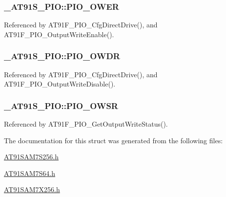 \hypertarget{struct__AT91S__PIO_c5ccf9a9b596512f34e6c324b406e071}{
\subsubsection{ {\bf \_\-AT91S\_\-PIO::PIO\_\-OWER}}}
\label{struct__AT91S__PIO_c5ccf9a9b596512f34e6c324b406e071}




Referenced by AT91F\_\-PIO\_\-CfgDirectDrive(), and AT91F\_\-PIO\_\-OutputWriteEnable().\hypertarget{struct__AT91S__PIO_8cbcb365dc730062e8d25307c54305f5}{
\subsubsection{ {\bf \_\-AT91S\_\-PIO::PIO\_\-OWDR}}}
\label{struct__AT91S__PIO_8cbcb365dc730062e8d25307c54305f5}




Referenced by AT91F\_\-PIO\_\-CfgDirectDrive(), and AT91F\_\-PIO\_\-OutputWriteDisable().\hypertarget{struct__AT91S__PIO_0354e307d02d69c83141ba4a3b099d79}{
\subsubsection{ {\bf \_\-AT91S\_\-PIO::PIO\_\-OWSR}}}
\label{struct__AT91S__PIO_0354e307d02d69c83141ba4a3b099d79}




Referenced by AT91F\_\-PIO\_\-GetOutputWriteStatus().

The documentation for this struct was generated from the following files:\begin{CompactItemize}
\item 
\hyperlink{AT91SAM7S256_8h}{AT91SAM7S256.h}\item 
\hyperlink{AT91SAM7S64_8h}{AT91SAM7S64.h}\item 
\hyperlink{AT91SAM7X256_8h}{AT91SAM7X256.h}\end{CompactItemize}
